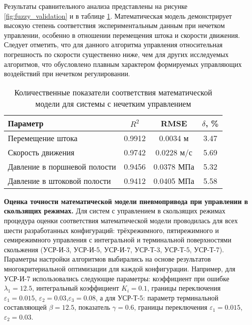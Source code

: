 Результаты сравнительного анализа представлены на рисунке \ref{fig:fuzzy_validation} и в
таблице \ref{tab:fuzzy_validation}. Математическая модель демонстрирует высокую степень
соответствия экспериментальным данным при нечетком управлении, особенно в отношении
перемещения штока и скорости движения. Следует отметить, что для данного алгоритма
управления относительная погрешность по скорости существенно ниже, чем для других
исследуемых алгоритмов, что обусловлено плавным характером формируемых управляющих воздействий при нечетком регулировании.

\begin{table}[ht]
	\centering
	\caption{Количественные показатели соответствия математической модели для системы с нечетким управлением}
	\small
	\label{tab:fuzzy_validation}
	\begin{tabular}{lccc}
		\hline
		\textbf{Параметр}            & $R^2$        & RMSE             & $\delta$, \% \\
		\hline
		Перемещение штока            & \num{0.9912} & \num{0.0034} м   & \num{3.47}   \\
		Скорость движения            & \num{0.9742} & \num{0.0228} м/с & \num{5.69}   \\
		Давление в поршневой полости & \num{0.9456} & \num{0.0378} МПа & \num{5.32}   \\
		Давление в штоковой полости  & \num{0.9412} & \num{0.0405} МПа & \num{5.58}   \\
		\hline
	\end{tabular}
\end{table}


\textbf{Оценка точности математической модели пневмопривода при управлении в скользящих режимах.}
Для систем с управлением в скользящих режимах процедура оценки соответствия
математической модели проводилась для всех шести разработанных конфигураций:
трёхрежимного, пятирежимного и семирежимного управления с интегральной и
терминальной поверхностями скольжения (УСР-И-3, УСР-И-5, УСР-И-7, УСР-Т-3, УСР-Т-5, УСР-Т-7).
Параметры настройки алгоритмов выбирались на основе результатов многокритериальной оптимизации
для каждой конфигурации. Например, для УСР-И-7 использовались следующие параметры:
коэффициент при ошибке $\lambda_1 = \num{12.5}$, интегральный коэффициент $K_i = \num{0.1}$,
границы переключения $\varepsilon_1 = \num{0.015}$, $\varepsilon_2 = \num{0.03}$,$\varepsilon_3 = \num{0.08}$,
а для УСР-Т-5: параметр терминальной составляющей $\beta = \num{12.5}$, показатель $\gamma = \num{0.6}$,
границы переключения $\varepsilon_1 = \num{0.015}$, $\varepsilon_2 = \num{0.03}$.

